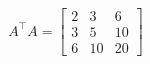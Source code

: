 \documentclass[preview]{standalone}
\begin{document}
\begin{align*}
A^\top A=\left[\begin{matrix}2&3&6\\3&5&10\\6&10&20\end{matrix}\right]
\end{align*}
\end{document}

